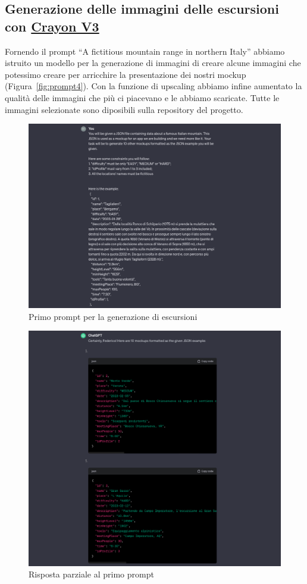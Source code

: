 \subsection{Generazione delle immagini delle escursioni con \href{https://www.craiyon.com}{Crayon V3}}
Fornendo il prompt ``A fictitious mountain range in northern Italy'' abbiamo istruito un modello per la generazione di immagini di creare alcune immagini che potessimo creare per arricchire la presentazione dei nostri mockup (Figura~\ref*{fig:prompt4}).
Con la funzione di upscaling abbiamo infine aumentato la qualità delle immagini che più ci piacevano e le abbiamo scaricate. Tutte le immagini selezionate sono diposibili sulla repository del progetto.
\newpage
\begin{figure}[ht]
  \includegraphics[width=\linewidth]{Iterazione 3/images/prompt1.png}
  \caption{Primo prompt per la generazione di escursioni}\label{fig:prompt1}
\end{figure}
\begin{figure}[ht]
  \includegraphics[width=\linewidth]{Iterazione 3/images/answer1.png}
  \caption{Risposta parziale al primo prompt}\label{fig:answ1}
\end{figure}
